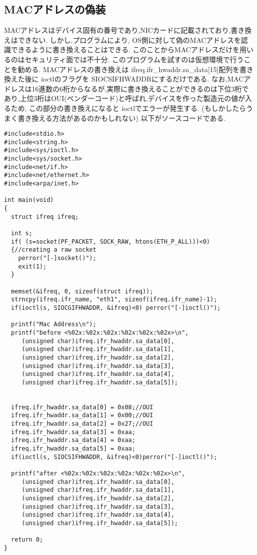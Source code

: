 \documentclass[a4paper]{article}%
\begin{document}
\subsection{MACアドレスの偽装}
MACアドレスはデバイス固有の番号であり,NICカードに記載されており,書き換えはできない.
しかし,プログラムにより, OS側に対して偽のMACアドレスを認識できるように書き換えることはできる.
このことからMACアドレスだけを用いるのはセキュリティ面では不十分.
このプログラムを試すのは仮想環境で行うことを勧める.
MACアドレスの書き換えは ifreq.ifr\_hwaddr.sa\_data[15]配列を書き換えた後に
ioctlのフラグを SIOCSIFHWADDRにするだけである.
なお,MACアドレスは16進数の6桁からなるが,実際に書き換えることができるのは下位3桁であり,上位3桁はOUI(ベンダーコード)と呼ばれ,デバイスを作った製造元の値が入るため, この部分の書き換えになると ioctlでエラーが発生する.
(もしかしたらうまく書き換える方法があるのかもしれない)
以下がソースコードである.

\begin{lstlisting}[caption=changeMACaddress, label=changeMACaddress]
#include<stdio.h>
#include<string.h>
#include<sys/ioctl.h>
#include<sys/socket.h>
#include<net/if.h>
#include<net/ethernet.h>
#include<arpa/inet.h>
 
int main(void)
{
  struct ifreq ifreq;
 
  int s;
  if( (s=socket(PF_PACKET, SOCK_RAW, htons(ETH_P_ALL)))<0) 
  {//creating a raw socket
    perror("[-]socket()");
    exit(1);
  }
  
  memset(&ifreq, 0, sizeof(struct ifreq));
  strncpy(ifreq.ifr_name, "eth1", sizeof(ifreq.ifr_name)-1);
  if(ioctl(s, SIOCGIFHWADDR, &ifreq)<0) perror("[-]ioctl()");
 
  printf("Mac Address\n");
  printf("before <%02x:%02x:%02x:%02x:%02x:%02x>\n",
	 (unsigned char)ifreq.ifr_hwaddr.sa_data[0],
	 (unsigned char)ifreq.ifr_hwaddr.sa_data[1],
	 (unsigned char)ifreq.ifr_hwaddr.sa_data[2],
	 (unsigned char)ifreq.ifr_hwaddr.sa_data[3],
	 (unsigned char)ifreq.ifr_hwaddr.sa_data[4],
	 (unsigned char)ifreq.ifr_hwaddr.sa_data[5]);
 
  
  ifreq.ifr_hwaddr.sa_data[0] = 0x08;//OUI
  ifreq.ifr_hwaddr.sa_data[1] = 0x00;//OUI
  ifreq.ifr_hwaddr.sa_data[2] = 0x27;//OUI
  ifreq.ifr_hwaddr.sa_data[3] = 0xaa;
  ifreq.ifr_hwaddr.sa_data[4] = 0xaa;
  ifreq.ifr_hwaddr.sa_data[5] = 0xaa;
  if(ioctl(s, SIOCSIFHWADDR, &ifreq)<0)perror("[-]ioctl()");
 
  printf("after <%02x:%02x:%02x:%02x:%02x:%02x>\n",
	 (unsigned char)ifreq.ifr_hwaddr.sa_data[0],
	 (unsigned char)ifreq.ifr_hwaddr.sa_data[1],
	 (unsigned char)ifreq.ifr_hwaddr.sa_data[2],
	 (unsigned char)ifreq.ifr_hwaddr.sa_data[3],
	 (unsigned char)ifreq.ifr_hwaddr.sa_data[4],
	 (unsigned char)ifreq.ifr_hwaddr.sa_data[5]);
 
  return 0;
}

\end{lstlisting}
\end{document}

